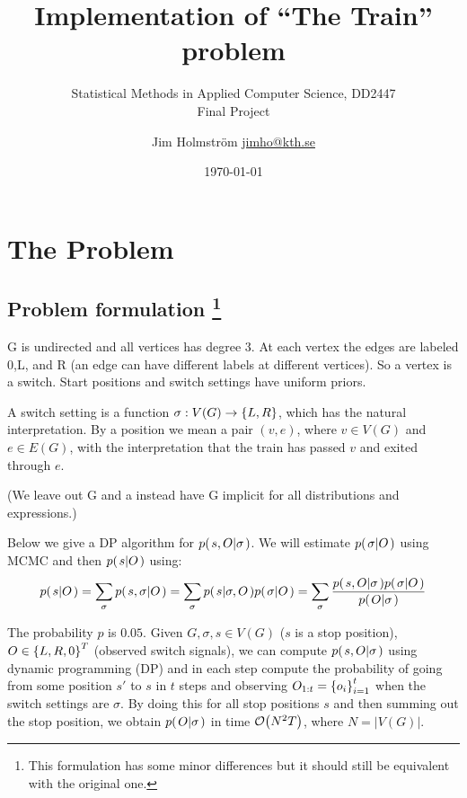 \documentclass[a4paper,11pt]{kth-mag}
\title{Implementation of ``The Train'' problem}
\subtitle{Statistical Methods in Applied Computer Science, DD2447\\ Final Project}
\author{
    Jim Holmstr\"{o}m \href{mailto:jimho@kth.se}{jimho@kth.se}
}
\date{\today}
\begin{document}
    \frontmatter
    \pagestyle{empty}
    \removepagenumbers
    \maketitle
    \tableofcontents*
    \mainmatter
    \pagestyle{newchap}

    \chapter{The Problem}
        \section[problemformulation]{
            Problem formulation 
            \footnote{
                This formulation has some minor differences but it should still 
                be equivalent with the original one.
            }
        }
        G is undirected and all vertices has degree 3. At each vertex the edges
        are labeled 0,L, and R (an edge can have different labels at different
        vertices). So a vertex is a switch. Start positions and switch settings
        have uniform priors.

        A switch setting is a function $\sigma: V(G)\rightarrow\left\{{L,R}\right\}$, which
        has the natural interpretation. By a position we mean a pair $(v,e)$,
        where $v\in V(G)$ and $e\in E(G)$, with the interpretation that the
        train has passed $v$ and exited through $e$.
        
        (We leave out G and a instead have G implicit for all distributions and expressions.)

        Below we give a DP algorithm for $p{(\left. s,O \middle\vert \sigma \right.)}$. We will
        estimate $p{(\left. \sigma \middle\vert O \right.)}$ using MCMC and then $p{(\left. s \middle\vert O \right.)}$
        using:
        \begin{equation}
            \label{eq:marginalization}
            p{(\left. s \middle\vert O \right.)} 
            = \sum\limits_\sigma
                p{(\left. s,\sigma \middle\vert O \right.)}
            = \sum\limits_\sigma
                p{(\left. s \middle\vert \sigma,O \right.)}p{(\left. \sigma \middle\vert O \right.)}
            = \sum\limits_\sigma
                \frac{
                    p{(\left. s,O \middle\vert \sigma \right.)}p{(\left. \sigma \middle\vert O \right.)}
                }{
                    p{(\left. O \middle\vert \sigma \right.)}
                }
        \end{equation}

    The probability $p$ is $0.05$. Given $G,\sigma,s\in V(G)$ ($s$ is a stop
    position), $O\in\left\{{L,R,0}\right\}^T$ (observed switch signals), we can compute 
    $p{(\left. s,O \middle\vert \sigma \right.)}$ using dynamic programming (DP) and in each step compute the probability
    of going from some position $s'$ to $s$ in $t$ steps and observing
    $O_{1:t}=\left\{{o_i}\right\}_{i=1}^t$ when the switch settings are $\sigma$. By doing this
    for all stop positions $s$ and then summing out the stop position, we
    obtain $p{(\left. O \middle\vert \sigma \right.)}$ in time $\mathcal{O}{\left(N^2T\right)}$, where $N=|V(G)|$.
\end{document}
